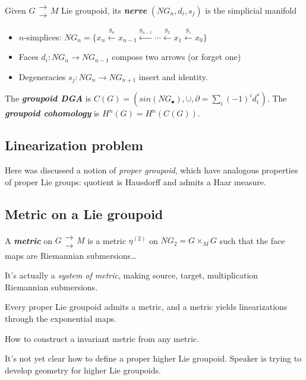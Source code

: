 Given \(G \substack{\to\\\to} M\) Lie groupoid, its \textit{\textbf{nerve}} \((NG_n,d_i,s_j)\) is the simplicial manifold
\begin{itemize}
\item \(n\)-simplices: \(NG_n=\{x_n \overset{g_n}{\leftarrow}x_{n-1}\overset{g_{n-1}}{\leftarrow}\cdots \overset{g_2}{\leftarrow}x_1\overset{g_1}{\leftarrow}x_0\}\) 
\item Faces \(d_i:NG_n \to NG_{n-1}\) compose two arrows (or forget one)
\item Degeneracies \(s_j:NG_n \to NG_{n+1}\) insert and identity.
\end{itemize}
The \textit{\textbf{groupoid DGA}} is \(C(G)=(sin(NG_\bullet),\cup ,\partial=\sum_{i}(-1)^i d_i^*)\). The \textit{\textbf{groupoid cohomology}} is \(H^{n}(G)=H^{n}(C(G))\).


\subsection{Linearization problem}
\begin{remark}\leavevmode
Here was discussed a notion of \textit{proper groupoid}, which have analogous properties of proper Lie groups: quotient is Hausdorff and admits a Haar measure.
\end{remark}
\subsection{Metric on a Lie groupoid}

\begin{defn}\leavevmode
A \textit{\textbf{metric}} on \(G \substack{\to\\\to}M\) is a metric \(\eta^{(2)}\) on \(NG_2=G \times_M G\) such that the face maps are Riemannian submersions…
\end{defn}
It's actually a \textit{system of metric}, making source, target, multiplication Riemannian submersions.

\begin{thm}[dH-Fernandes, 2018]\leavevmode
Every proper Lie groupoid admits a metric, and a metric yields linearizations through the exponential maps.
\end{thm}

\begin{remark}\leavevmode
How to construct a invariant metric from any metric.
\end{remark}

\begin{remark}\leavevmode
It's not yet clear how to define a proper higher Lie groupoid. Speaker is trying to develop geometry for higher Lie groupoids.
\end{remark}

